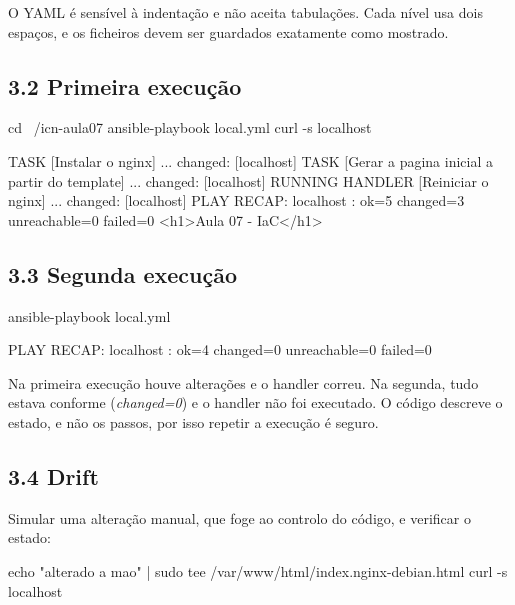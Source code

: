 \documentclass[11pt,a4paper]{article}
\begin{document}
\begin{nota}
O YAML é sensível à indentação e não aceita tabulações. Cada nível usa dois espaços, e os ficheiros devem ser guardados exatamente como mostrado.
\end{nota}

\subsection*{3.2 Primeira execução}

\begin{terminal}
cd ~/icn-aula07
ansible-playbook local.yml
curl -s localhost
\end{terminal}

\begin{saida}
TASK [Instalar o nginx] ... changed: [localhost]
TASK [Gerar a pagina inicial a partir do template] ... changed: [localhost]
RUNNING HANDLER [Reiniciar o nginx] ... changed: [localhost]
PLAY RECAP: localhost : ok=5  changed=3  unreachable=0  failed=0
<h1>Aula 07 - IaC</h1>
\end{saida}

\subsection*{3.3 Segunda execução}

\begin{terminal}
ansible-playbook local.yml
\end{terminal}

\begin{saida}
PLAY RECAP: localhost : ok=4  changed=0  unreachable=0  failed=0
\end{saida}

\begin{observe}
Na primeira execução houve alterações e o handler correu. Na segunda, tudo estava conforme (\emph{changed=0}) e o handler não foi executado. O código descreve o estado, e não os passos, por isso repetir a execução é seguro.
\end{observe}

\subsection*{3.4 Drift}

Simular uma alteração manual, que foge ao controlo do código, e verificar o estado:

\begin{terminal}
echo "alterado a mao" | sudo tee /var/www/html/index.nginx-debian.html
curl -s localhost
\end{terminal}
\end{document}
